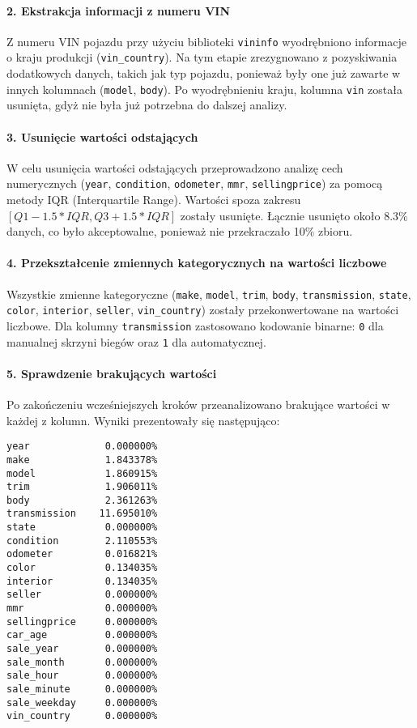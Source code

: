 \documentclass[10pt,letterpaper]{article}
\begin{document}
\paragraph{2. Ekstrakcja informacji z numeru VIN}
Z numeru VIN pojazdu przy użyciu biblioteki \texttt{vininfo} wyodrębniono informacje o kraju produkcji (\texttt{vin\_country}). Na tym etapie zrezygnowano z pozyskiwania dodatkowych danych, takich jak typ pojazdu, ponieważ były one już zawarte w innych kolumnach (\texttt{model}, \texttt{body}). Po wyodrębnieniu kraju, kolumna \texttt{vin} została usunięta, gdyż nie była już potrzebna do dalszej analizy.

\paragraph{3. Usunięcie wartości odstających}
W celu usunięcia wartości odstających przeprowadzono analizę cech numerycznych (\texttt{year}, \texttt{condition}, \texttt{odometer}, \texttt{mmr}, \texttt{sellingprice}) za pomocą metody IQR (Interquartile Range). Wartości spoza zakresu $[Q1 - 1.5 * IQR, Q3 + 1.5 * IQR]$ zostały usunięte. Łącznie usunięto około 8.3\% danych, co było akceptowalne, ponieważ nie przekraczało 10\% zbioru.

\paragraph{4. Przekształcenie zmiennych kategorycznych na wartości liczbowe}
Wszystkie zmienne kategoryczne (\texttt{make}, \texttt{model}, \texttt{trim}, \texttt{body}, \texttt{transmission}, \texttt{state}, \texttt{color}, \texttt{interior}, \texttt{seller}, \texttt{vin\_country}) zostały przekonwertowane na wartości liczbowe. Dla kolumny \texttt{transmission} zastosowano kodowanie binarne: \texttt{0} dla manualnej skrzyni biegów oraz \texttt{1} dla automatycznej.

\paragraph{5. Sprawdzenie brakujących wartości}
Po zakończeniu wcześniejszych kroków przeanalizowano brakujące wartości w każdej z kolumn. Wyniki prezentowały się następująco:

\begin{verbatim}
year             0.000000%
make             1.843378%
model            1.860915%
trim             1.906011%
body             2.361263%
transmission    11.695010%
state            0.000000%
condition        2.110553%
odometer         0.016821%
color            0.134035%
interior         0.134035%
seller           0.000000%
mmr              0.000000%
sellingprice     0.000000%
car_age          0.000000%
sale_year        0.000000%
sale_month       0.000000%
sale_hour        0.000000%
sale_minute      0.000000%
sale_weekday     0.000000%
vin_country      0.000000%
\end{verbatim}
\end{document}
